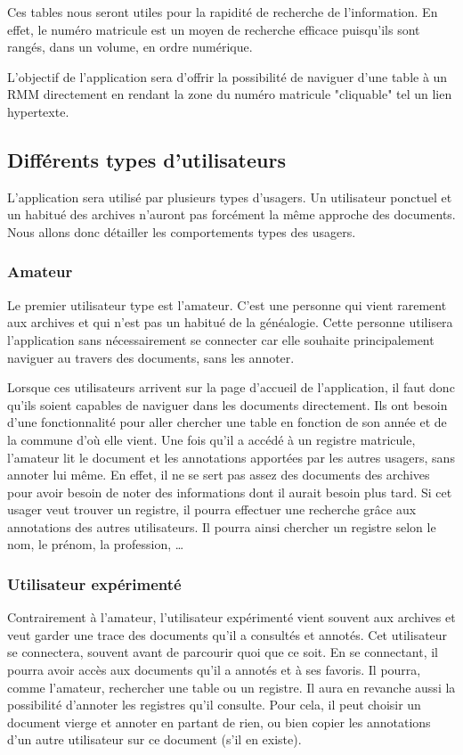 \documentclass[a4paper]{article}
\begin{document}
Ces tables nous seront utiles pour la rapidité de recherche de l'information. En effet, le numéro matricule est un moyen de recherche efficace puisqu'ils sont rangés, dans un volume, en ordre numérique. 

L'objectif de l'application sera d'offrir la possibilité de naviguer d'une table à un RMM directement en rendant la zone du numéro matricule "cliquable" tel un lien hypertexte.

\subsection{Différents types d'utilisateurs}
L'application sera utilisé par plusieurs types d'usagers. Un utilisateur ponctuel et un habitué des archives n'auront pas forcément la même approche des documents. Nous allons donc détailler les comportements types des usagers.

\subsubsection{Amateur}
Le premier utilisateur type est l'amateur. C'est une personne qui vient rarement aux archives et qui n'est pas un habitué de la généalogie. Cette personne utilisera l'application sans nécessairement se connecter car elle souhaite principalement naviguer au travers des documents, sans les annoter.

Lorsque ces utilisateurs arrivent sur la page d'accueil de l'application, il faut donc qu'ils soient capables de naviguer dans les documents directement. Ils ont besoin d'une fonctionnalité pour aller chercher une table en fonction de son année et de la commune d'où elle vient. Une fois qu'il a accédé à un registre matricule, l'amateur lit le document et les annotations apportées par les autres usagers, sans annoter lui même. En effet, il ne se sert pas assez des documents des archives pour avoir besoin de noter des informations dont il aurait besoin plus tard. Si cet usager veut trouver un registre, il pourra effectuer une recherche grâce aux annotations des autres utilisateurs. Il pourra ainsi chercher un registre selon le nom, le prénom, la profession, \ldots

\subsubsection{Utilisateur expérimenté}
Contrairement à l'amateur, l'utilisateur expérimenté vient souvent aux archives et veut garder une trace des documents qu'il a consultés et annotés. Cet utilisateur se connectera, souvent avant de parcourir quoi que ce soit. En se connectant, il pourra avoir accès aux documents qu'il a annotés et à ses favoris. Il pourra, comme l'amateur, rechercher une table ou un registre. Il aura en revanche aussi la possibilité d'annoter les registres qu'il consulte. Pour cela, il peut choisir un document vierge et annoter en partant de rien, ou bien copier les annotations d'un autre utilisateur sur ce document (s'il en existe).
\end{document}
